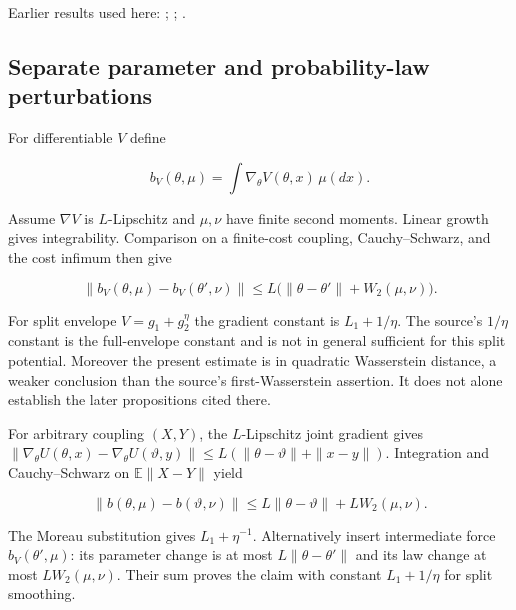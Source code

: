 \documentclass[11pt,a4paper]{report}
\begin{document}
Earlier results used here: \cite[Section~3.1.1]{LangevinLean2026IPLA}; \cite[Section~3.3.1]{LangevinLean2026IPLA}; \cite[Section~3.9.1]{LangevinLean2026IPLA}.
\subsection{\texorpdfstring{Separate parameter and probability-law perturbations}{Separate parameter and probability-law perturbations}}
\label{report-step-ProximalLangevin-MeanFieldDrift-lean-4}


For differentiable \(V\) define

\[
b_V(\theta,\mu)=\int \nabla_\theta V(\theta,x)\,\mu(dx).
\]

Assume \(\nabla V\) is \(L\)-Lipschitz and \(\mu,\nu\) have finite second moments. Linear growth gives integrability. Comparison on a finite-cost coupling, Cauchy–Schwarz, and the cost infimum then give

\[
\|b_V(\theta,\mu)-b_V(\theta',\nu)\|
 \le L\bigl(\|\theta-\theta'\|+W_2(\mu,\nu)\bigr).
\]

For split envelope \(V=g_1+g_2^\eta\) the gradient constant is \(L_1+1/\eta\). The source’s \(1/\eta\) constant is the full-envelope constant and is not in general sufficient for this split potential. Moreover the present estimate is in quadratic Wasserstein distance, a weaker conclusion than the source’s first-Wasserstein assertion. It does not alone establish the later propositions cited there.



For arbitrary coupling \((X,Y)\), the \(L\)-Lipschitz joint gradient gives \(\|\nabla_\theta U(\theta,x)-\nabla_\theta U(\vartheta,y)\|\le L(\|\theta-\vartheta\|+\|x-y\|)\). Integration and Cauchy–Schwarz on \(\mathbb E\|X-Y\|\) yield

\[\|b(\theta,\mu)-b(\vartheta,\nu)\|\le L\|\theta-\vartheta\|+LW_2(\mu,\nu).\]

The Moreau substitution gives \(L_1+\eta^{-1}\). Alternatively insert intermediate force \(b_V(\theta',\mu)\): its parameter change is at most \(L\|\theta-\theta'\|\) and its law change at most \(LW_2(\mu,\nu)\). Their sum proves the claim with constant \(L_1+1/\eta\) for split smoothing.
\end{document}
